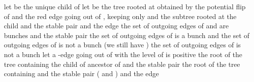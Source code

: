 \documentclass[11pt,a4paper]{article}
\begin{document}
\begin{small}
\begin{codebox}
\li      let  be the unique child of 
\li      
\li       let  be the tree rooted at  obtained by the potential flip of  and the red edge 
\zi     going out of , keeping only  and the subtree rooted at the child 
\li        \If   
\li             \Then {}   
\li                   \Return  and the stable pair  
                \End
\li         \If  
\li             \Then \Return  and the edge 
                 \End
\li         \If  
\li             \Then \If the set of outgoing edges of  and  are bunches
\li                    \Then \Return  and the stable pair  
                       \End
\li                    \If the set of outgoing edges of  is a bunch 
\zi                            and the set of outgoing edges of  is not a bunch
\li                           \Then   
\li                                   {}  (we still have ) \li                                   \Return 
                        \End
\li                    \If the set of outgoing edges of  is not a bunch 
\li                          \Then let  a -edge going out of  with 
\li                                \If   
\li                                    \Then 
\li                                         \If  the level of  is positive
\li                                              \Then  the root of the tree containing 
\li                                                     
\li                                                      the child of  ancestor of 
\li                                                     \Return  and the stable pair  
\li                                              \Else  the root of the tree containing 
\li                                                     
\li                                                     \Return  and the stable pair  
                                                  \End
\li                                    \Else ( and ) 
\li                                           \Return  and the edge 
                                       \End 
                            \End
           \End
\end{codebox}
\end{small}
\end{document}
